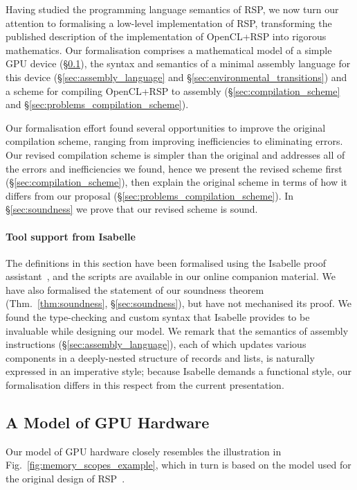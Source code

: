 \documentclass[svgnames,10pt]{sigplanconf}
\theoremstyle{definition}
\begin{document}
Having studied the programming language semantics of RSP,
we now turn our attention to
formalising a low-level implementation of RSP, transforming the published description of the implementation of
OpenCL+RSP into rigorous mathematics.
%
Our formalisation comprises a mathematical model of a simple GPU device
(\S\ref{sec:hardware_model}), the syntax and semantics of a minimal
assembly language for this device (\S\ref{sec:assembly_language} and \S\ref{sec:environmental_transitions})
and a scheme for compiling OpenCL+RSP to assembly
(\S\ref{sec:compilation_scheme} and \S\ref{sec:problems_compilation_scheme}).

Our formalisation effort 
found several opportunities to improve the original compilation scheme,
ranging from improving inefficiencies to eliminating errors.
Our revised compilation scheme is simpler than the original and addresses
all of the errors and inefficiencies we found, hence we present the revised scheme first
(\S\ref{sec:compilation_scheme}), then explain
the original scheme in terms of how it differs from our proposal
(\S\ref{sec:problems_compilation_scheme}). In \S\ref{sec:soundness} we prove that our revised scheme is sound.

\paragraph{Tool support from Isabelle}
The definitions in this section have been formalised using the
Isabelle proof assistant~\cite{nipkow+02}, and the scripts are
available in our online companion material. We have also formalised
the statement of our soundness theorem (Thm.~\ref{thm:soundness},
\S\ref{sec:soundness}), but have not mechanised its proof. We found
the type-checking and custom syntax that Isabelle provides to be
invaluable while designing our model. We remark that the semantics of
assembly instructions (\S\ref{sec:assembly_language}), each of which
updates various components in a deeply-nested structure of records and
lists, is naturally expressed in an imperative style; because Isabelle
demands a functional style, our formalisation differs in this respect
from the current presentation.


\subsection{A Model of GPU Hardware}
\label{sec:hardware_model}

Our model of GPU hardware closely resembles the illustration in
Fig.~\ref{fig:memory_scopes_example}, which in turn is based on the model used for the original design of RSP~\cite[Fig.~4]{orr+15}.
\end{document}
